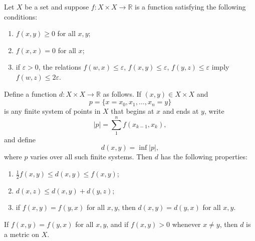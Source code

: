 \begin{lemma}
    Let \( X \) be a set and suppose \( f : X \times X \to \mathbb{R} \) is a function satisfying the following conditions:
    \begin{enumerate}[(1)]
        \item \( f(x, y) \ge 0 \) for all \( x, y \);
        \item \( f(x, x) = 0 \) for all \( x \);
        \item if \( \varepsilon > 0 \), the relations \( f(w, x) \le \varepsilon \), \( f(x, y) \le \varepsilon \), \( f(y, z) \le \varepsilon \) imply \( f(w, z) \le 2\varepsilon \).
    \end{enumerate}

    Define a function \( d : X \times X \to \mathbb{R} \) as follows.
    If \( (x, y) \in X \times X \) and
    \[
        p = \{ x = x_0, x_1, \ldots, x_n = y \}
    \]
    is any finite system of points in \( X \) that begins at \( x \) and ends at \( y \), write
    \[
        |p| = \sum_{1}^{n} f(x_{k-1}, x_k),
    \]
    and define
    \[
        d(x, y) = \inf |p|,
    \]
    where \( p \) varies over all such finite systems.
    Then \( d \) has the following properties:
    \begin{enumerate}
        \item[(4)] \( \tfrac{1}{2} f(x, y) \le d(x, y) \le f(x, y) \);
        \item[(5)] \( d(x, z) \le d(x, y) + d(y, z) \);
        \item[(6)] if \( f(x, y) = f(y, x) \) for all \( x, y \), then \( d(x, y) = d(y, x) \) for all \( x, y \).
    \end{enumerate}

    If \( f(x, y) = f(y, x) \) for all \( x, y \), and if \( f(x, y) > 0 \) whenever \( x \neq y \), then \( d \) is a metric on \( X \).
\end{lemma}



